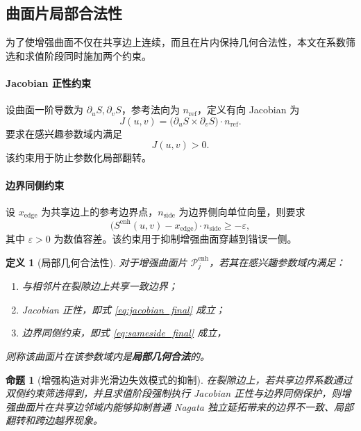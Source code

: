 \documentclass[11pt,a4paper]{ctexart}
\newtheorem{definition}{定义}
\newtheorem{proposition}{命题}
\begin{document}
\subsection{曲面片局部合法性}
为了使增强曲面不仅在共享边上连续，而且在片内保持几何合法性，本文在系数筛选和求值阶段同时施加两个约束。

\paragraph{Jacobian 正性约束}
设曲面一阶导数为 $\partial_u S,\partial_v S$，参考法向为 $n_{\mathrm{ref}}$，定义有向 Jacobian 为
\begin{equation}
J(u,v)=\big(\partial_u S \times \partial_v S\big)\cdot n_{\mathrm{ref}}.
\label{eq:jacobian_final}
\end{equation}
要求在感兴趣参数域内满足
\[
J(u,v)>0.
\]
该约束用于防止参数化局部翻转。

\paragraph{边界同侧约束}
设 $x_{\mathrm{edge}}$ 为共享边上的参考边界点，$n_{\mathrm{side}}$ 为边界侧向单位向量，则要求
\begin{equation}
\big(S^{\mathrm{enh}}(u,v)-x_{\mathrm{edge}}\big)\cdot n_{\mathrm{side}}\ge -\varepsilon,
\label{eq:sameside_final}
\end{equation}
其中 $\varepsilon>0$ 为数值容差。该约束用于抑制增强曲面穿越到错误一侧。

\begin{definition}[局部几何合法性]
对于增强曲面片 $\mathcal{P}^{\mathrm{enh}}_j$，若其在感兴趣参数域内满足：
\begin{enumerate}[leftmargin=2em]
    \item 与相邻片在裂隙边上共享一致边界；
    \item Jacobian 正性，即式 \eqref{eq:jacobian_final} 成立；
    \item 边界同侧约束，即式 \eqref{eq:sameside_final} 成立，
\end{enumerate}
则称该曲面片在该参数域内是\textbf{局部几何合法}的。
\end{definition}

\begin{proposition}[增强构造对非光滑边失效模式的抑制]
在裂隙边上，若共享边界系数通过双侧约束筛选得到，并且求值阶段强制执行 Jacobian 正性与边界同侧保护，则增强曲面片在共享边邻域内能够抑制普通 Nagata 独立延拓带来的边界不一致、局部翻转和跨边越界现象。
\end{proposition}
\end{document}
